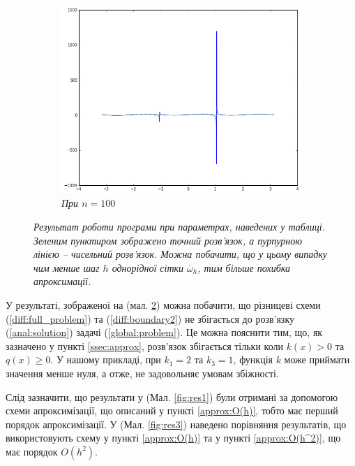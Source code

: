 \begin{figure}[h!]
\begin{subfigure}{.5\textwidth}
  \centering
  \includegraphics[width=.95\linewidth]{res2_n1500}
  \caption{\it При \(n = 100\)}
  \label{fig:sub2}
\end{subfigure}
\caption{{\it Результат роботи програми \cite{SourceCode} при параметрах, наведених у таблиці. Зеленим пунктиром зображено точний розв'язок, а пурпурною лінією -- чисельний розв'язок. Можна побачити, що у цьому випадку чим менше шаг \(h\) однорідної сітки \( \overline{\omega}_h\), тим більше похибка апроксимації.}}
\label{fig:res2}
\end{figure}

У результаті, зображеної на (мал. \ref{fig:res2}) можна побачити, що різницеві схеми (\ref{diff:full_problem}) та (\ref{diff:boundary2}) не збігається до розв'язку (\ref{anal:solution}) задачі (\ref{global:problem}). Це можна пояснити тим, що, як зазначено у пункті \ref{ssec:approx}, розв'язок збігається тільки коли \( k(x) > 0\) та \(q(x) \geq 0\). У нашому прикладі, при \( k_1 = 2\) та  \( k_3 = 1\), функція \(k\) може приймати значення менше нуля, а отже, не задовольняє умовам збіжності.

\bigskip

Слід зазначити, що результати у (Мал. \ref{fig:res1}) були отримані за допомогою схеми апроксимізації, що описаний у пункті \ref{approx:O(h)}, тобто має перший порядок апроксимізації. У (Мал. \ref{fig:res3}) наведено порівняння результатів, що використовують схему у пункті \ref{approx:O(h)} та у пункті \ref{approx:O(h^2)}, що має порядок \(O(h^2)\).

